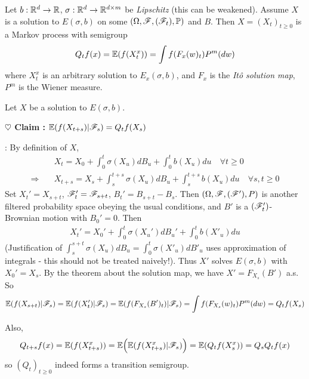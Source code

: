 \documentclass[12pt,a4paper]{article}
\newenvironment{proof}
{\begin{changemargin}{0.5cm}{0.5cm} 
	}%
	{\end{changemargin}
}
\newenvironment{subproof}
{\begin{changemargin}{0.5cm}{0.5cm} 
	}%
	{\end{changemargin}
}
\newenvironment{p}
{\begin{proof} 
	}%
	{\end{proof}
}
\begin{document}
\thm Let $b: \mathbb{R}^d \rightarrow \mathbb{R}$, $\sigma : \mathbb{R}^d \rightarrow \mathbb{R}^{d\times m}$ be \emph{Lipschitz} (this can be weakened). Assume $X$ is a solution to $E(\sigma, b)$ on some $(\Omega, \mathscr{F}, (\mathscr{F}_t), \mathbb{P})$ and $B$. Then $X= (X_t)_{t\geq 0}$ is a Markov process with semigroup
\begin{align*}
Q_t f(x) = \mathbb{E} (f(X_t^x)) = \int f(F_x(w)_t) P^m(dw)
\end{align*}
where $X_t^x$ is an arbitrary solution to $E_x(\sigma,b)$, and $F_x$ is the \emph{It\^o solution map}, $P^m$ is the Wiener measure.
\begin{p}
\pf Let $X$ be a solution to $E(\sigma, b)$.

\textbf{$\heartsuit$ Claim :} $\mathbb{E}(f(X_{t+s})|\mathscr{F}_s) = Q_t f(X_s)$
\begin{subproof}
: By definition of $X$,
\begin{align*}
& X_t = X_0 + \int_0^t \sigma(X_u) dB_u + \int_0^t b(X_u) du \quad \forall t\geq 0 \\
\Rightarrow \quad & X_{t+s} = X_s + \int_s^{t+s} \sigma (X_u) dB_u + \int_s^{t+s} b(X_u) du \quad \forall s,t\geq 0
\end{align*}
Set $X_t' = X_{s+t}$, $\mathscr{F}_t' = \mathscr{F}_{s+t}$, $B_t' = B_{s+t} - B_s$. Then $(\Omega, \mathscr{F}, (\mathscr{F}'), P)$ is another filtered probability space obeying the usual conditions, and $B'$ is a $(\mathscr{F}'_t)$-Brownian motion with $B_0' =0$. Then
\begin{align*}
X_t' = X_0' + \int_0^t \sigma(X_u') dB_u' + \int_0^t b(X'_u) du 
\end{align*}
(Justification of $\int_s^{s+t} \sigma(X_u) dB_u = \int_0^t \sigma(X'_u)dB'_u$ uses approximation of integrals - this should not be treated naively!). Thus $X'$ solves $E(\sigma, b)$ with $X_0' = X_s$. By the theorem about the solution map, we have $X' = F_{X_s} (B')$ a.s. So
\begin{align*}
\mathbb{E}(f(X_{s+t})|\mathscr{F}_s) = \mathbb{E}(f(X_t') | \mathscr{F}_s) = \mathbb{E}(f(F_{X_s}(B')_t) |\mathscr{F}_s) = \int f(F_{X_s}(w)_t) P^m(dw) = Q_t f(X_s)
\end{align*}
\end{subproof}
Also, 
\begin{align*}
Q_{t+s} f(x) = \mathbb{E} (f(X_{t+s}^x)) = \mathbb{E}\Big( \mathbb{E}(f(X_{t+s}^x) | \mathscr{F}_s) \Big) = \mathbb{E} (Q_t f(X_s^x)) = Q_s Q_t f(x)
\end{align*}
so $(Q_t)_{t\geq 0}$ indeed forms a transition semigroup.

\eop
\end{p}
\s
\end{document}
